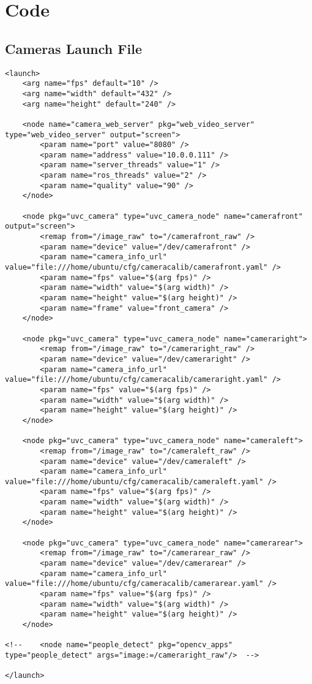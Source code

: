 \appendixpagenumbering
\chapter{Code} 

\section{Cameras Launch File}
\begin{verbatim}
<launch>
	<arg name="fps" default="10" />	
	<arg name="width" default="432" />	
	<arg name="height" default="240" />	

	<node name="camera_web_server" pkg="web_video_server"  type="web_video_server" output="screen">
		<param name="port" value="8080" />
		<param name="address" value="10.0.0.111" />
		<param name="server_threads" value="1" />
		<param name="ros_threads" value="2" />
		<param name="quality" value="90" />
	</node>

	<node pkg="uvc_camera" type="uvc_camera_node" name="camerafront" output="screen">
		<remap from="/image_raw" to="/camerafront_raw" />
		<param name="device" value="/dev/camerafront" />
		<param name="camera_info_url" value="file:///home/ubuntu/cfg/cameracalib/camerafront.yaml" />
		<param name="fps" value="$(arg fps)" />
		<param name="width" value="$(arg width)" />
		<param name="height" value="$(arg height)" />
		<param name="frame" value="front_camera" />
	</node>

	<node pkg="uvc_camera" type="uvc_camera_node" name="cameraright">
		<remap from="/image_raw" to="/cameraright_raw" />
		<param name="device" value="/dev/cameraright" />
		<param name="camera_info_url" value="file:///home/ubuntu/cfg/cameracalib/cameraright.yaml" />
		<param name="fps" value="$(arg fps)" />
		<param name="width" value="$(arg width)" />
		<param name="height" value="$(arg height)" />
	</node>

	<node pkg="uvc_camera" type="uvc_camera_node" name="cameraleft">
		<remap from="/image_raw" to="/cameraleft_raw" />
		<param name="device" value="/dev/cameraleft" />
		<param name="camera_info_url" value="file:///home/ubuntu/cfg/cameracalib/cameraleft.yaml" />
		<param name="fps" value="$(arg fps)" />
		<param name="width" value="$(arg width)" />
		<param name="height" value="$(arg height)" />
	</node>

	<node pkg="uvc_camera" type="uvc_camera_node" name="camerarear">
		<remap from="/image_raw" to="/camerarear_raw" />
		<param name="device" value="/dev/camerarear" />
		<param name="camera_info_url" value="file:///home/ubuntu/cfg/cameracalib/camerarear.yaml" />
		<param name="fps" value="$(arg fps)" />
		<param name="width" value="$(arg width)" />
		<param name="height" value="$(arg height)" />
	</node>

<!--	<node name="people_detect" pkg="opencv_apps" type="people_detect" args="image:=/cameraright_raw"/>  -->

</launch>
\end{verbatim}
